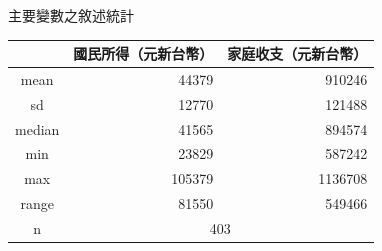 \documentclass[12pt]{beamer}
\begin{document}
\begin{frame}{主要變數之敘述統計}{}
	\begin{center}
	 \begin{tabular}{ c r r} 
	  \hline
	  & 國民所得（元新台幣） & 家庭收支（元新台幣） \\ 
	  \hline
	  mean & 44379 & 910246  \\ 
	  sd & 12770 & 121488  \\
	  median & 41565 & 894574  \\ 
	  min & 23829 & 587242  \\ 
	  max & 105379 & 1136708  \\ 
	  range & 81550 & 549466 \\ 
	  n & \multicolumn{2}{c}{403} \\
	  \hline
	 \end{tabular}
	\end{center}
\end{frame}



\end{document}
